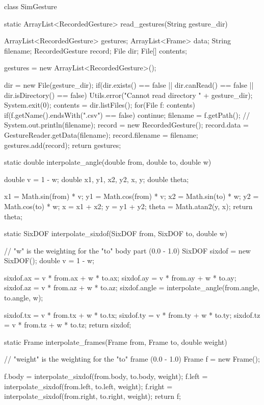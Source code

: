 \documentclass[12pt,a4,notitlepage]{report}
\renewcommand{\_}{\texttt{\symbol{95}}}
\newcommand{\<}{\texttt{\symbol{60}}}
\renewcommand{\>}{\texttt{\symbol{62}}}
\begin{document}
\begin{code}
class SimGesture
{  
   static ArrayList<RecordedGesture> read_gestures(String gesture_dir)
   {
      ArrayList<RecordedGesture> gestures;
      ArrayList<Frame> data;
      String filename;
      RecordedGesture record;
      File dir;
      File[] contents;
      
      gestures = new ArrayList<RecordedGesture>();
      
      dir = new File(gesture_dir);
      if(dir.exists() == false || dir.canRead() == false ||
            dir.isDirectory() == false)
      {
         Utils.error("Cannot read directory " + gesture_dir);
         System.exit(0);
      }
      contents = dir.listFiles();
      for(File f: contents)
      {
         if(f.getName().endsWith(".csv") == false)
            continue;
         filename = f.getPath();
         // System.out.println(filename);
         record = new RecordedGesture();
         record.data = GestureReader.getData(filename);
         record.filename = filename;
         gestures.add(record);
      }
      return gestures;
   }

   static double interpolate_angle(double from, double to, double w)
   {
      double v = 1 - w;
      double x1, y1, x2, y2, x, y;
      double theta;
      
      x1 = Math.sin(from) * v;
      y1 = Math.cos(from) * v;
      x2 = Math.sin(to) * w;
      y2 = Math.cos(to) * w;
      x = x1 + x2;
      y = y1 + y2;
      theta = Math.atan2(y, x);
      return theta;
   }
   
   static SixDOF interpolate_sixdof(SixDOF from, SixDOF to, double w)
   {
      // "w" is the weighting for the "to" body part (0.0 - 1.0)
      SixDOF sixdof = new SixDOF();
      double v = 1 - w;
      
      sixdof.ax = v * from.ax + w * to.ax;
      sixdof.ay = v * from.ay + w * to.ay;
      sixdof.az = v * from.az + w * to.az;
      sixdof.angle = interpolate_angle(from.angle, to.angle, w);
      
      sixdof.tx = v * from.tx + w * to.tx;
      sixdof.ty = v * from.ty + w * to.ty;
      sixdof.tz = v * from.tz + w * to.tz;
      return sixdof;
   }
   
   static Frame interpolate_frames(Frame from, Frame to, double weight)
   {
      // "weight" is the weighting for the "to" frame (0.0 - 1.0)
      Frame f = new Frame();
      
      f.body = interpolate_sixdof(from.body, to.body, weight);
      f.left = interpolate_sixdof(from.left, to.left, weight);
      f.right = interpolate_sixdof(from.right, to.right, weight);
      return f;
   }
   
}
\end{code}
\end{document}

